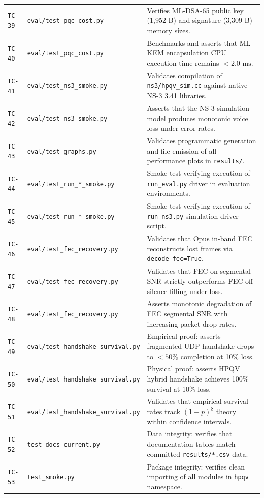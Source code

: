 \begin{table}[htbp]
\begin{tabularx}{\textwidth}{l l p{8.5cm}}
        \texttt{TC-39} & \texttt{eval/test\_pqc\_cost.py} & Verifies ML-DSA-65 public key (1,952 B) and signature (3,309 B) memory sizes. \\
        \texttt{TC-40} & \texttt{eval/test\_pqc\_cost.py} & Benchmarks and asserts that ML-KEM encapsulation CPU execution time remains $<2.0\text{ ms}$. \\
        \texttt{TC-41} & \texttt{eval/test\_ns3\_smoke.py} & Validates compilation of \texttt{ns3/hpqv\_sim.cc} against native NS-3 3.41 libraries. \\
        \texttt{TC-42} & \texttt{eval/test\_ns3\_smoke.py} & Asserts that the NS-3 simulation model produces monotonic voice loss under error rates. \\
        \texttt{TC-43} & \texttt{eval/test\_graphs.py} & Validates programmatic generation and file emission of all performance plots in \texttt{results/}. \\
        \texttt{TC-44} & \texttt{eval/test\_run\_*\_smoke.py} & Smoke test verifying execution of \texttt{run\_eval.py} driver in evaluation environments. \\
        \texttt{TC-45} & \texttt{eval/test\_run\_*\_smoke.py} & Smoke test verifying execution of \texttt{run\_ns3.py} simulation driver script. \\
        \texttt{TC-46} & \texttt{eval/test\_fec\_recovery.py} & Validates that Opus in-band FEC reconstructs lost frames via \texttt{decode\_fec=True}. \\
        \texttt{TC-47} & \texttt{eval/test\_fec\_recovery.py} & Validates that FEC-on segmental SNR strictly outperforms FEC-off silence filling under loss. \\
        \texttt{TC-48} & \texttt{eval/test\_fec\_recovery.py} & Asserts monotonic degradation of FEC segmental SNR with increasing packet drop rates. \\
        \texttt{TC-49} & \texttt{eval/test\_handshake\_survival.py} & Empirical proof: asserts fragmented UDP handshake drops to $<50\%$ completion at 10\% loss. \\
        \texttt{TC-50} & \texttt{eval/test\_handshake\_survival.py} & Physical proof: asserts HPQV hybrid handshake achieves 100\% survival at 10\% loss. \\
        \texttt{TC-51} & \texttt{eval/test\_handshake\_survival.py} & Validates that empirical survival rates track $(1-p)^8$ theory within confidence intervals. \\
        \texttt{TC-52} & \texttt{test\_docs\_current.py} & Data integrity: verifies that documentation tables match committed \texttt{results/*.csv} data. \\
        \texttt{TC-53} & \texttt{test\_smoke.py} & Package integrity: verifies clean importing of all modules in \texttt{hpqv} namespace. \\
        \bottomrule
    \end{tabularx}
\end{table}
